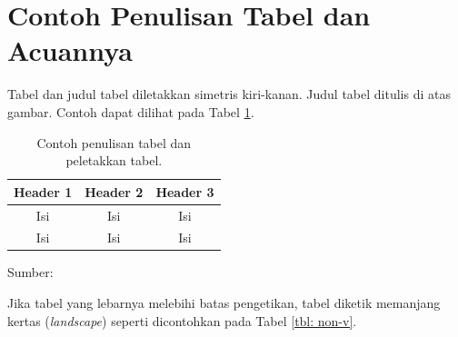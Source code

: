 


\section{Contoh Penulisan Tabel dan Acuannya}
Tabel dan judul tabel diletakkan simetris kiri-kanan. Judul tabel ditulis di atas gambar.
Contoh dapat dilihat pada Tabel \ref{tbl:1}.

\begin{table}[!h]
    \caption{Contoh penulisan tabel dan peletakkan tabel.}
    \label{tbl:1}
    \centering
\begin{tabular}{|c|c|c|}
\hline
Header 1 & Header 2 & Header 3 \\ 
\hline
Isi & Isi & Isi \\ 
\hline
Isi & Isi & Isi \\
\hline
\end{tabular}

\hspace{-4cm}\footnotesize{Sumber: \cite{book2}}
\end{table}

Jika tabel  yang lebarnya melebihi batas pengetikan, tabel diketik memanjang kertas (\textit{landscape}) seperti dicontohkan pada Tabel \ref{tbl: non-v}.


